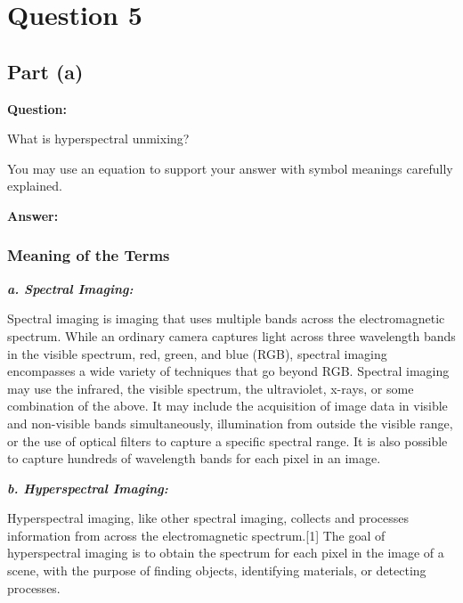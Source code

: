 \documentclass[fleqn, 11pt]{article}
\begin{document}
\newpage


\section*{Question 5}
\setcounter{equation}{0}


\subsection*{Part (a)}

\textbf{Question: }

\smallskip

What is hyperspectral unmixing? 

You may use an equation to support your answer with symbol
meanings carefully explained.

\hrulefill

\medskip

\textbf{Answer: }
\subsubsection*{Meaning of the Terms}

\textbf{\textit{a. Spectral Imaging: }}

\smallskip

Spectral imaging is imaging that uses multiple bands across the electromagnetic spectrum. While an ordinary camera captures light across three wavelength bands in the visible spectrum, red, green, and blue (RGB), spectral imaging encompasses a wide variety of techniques that go beyond RGB. Spectral imaging may use the infrared, the visible spectrum, the ultraviolet, x-rays, or some combination of the above. It may include the acquisition of image data in visible and non-visible bands simultaneously, illumination from outside the visible range, or the use of optical filters to capture a specific spectral range. It is also possible to capture hundreds of wavelength bands for each pixel in an image.

\medskip

\textbf{\textit{b. Hyperspectral Imaging:}}

\smallskip

Hyperspectral imaging, like other spectral imaging, collects and processes information from across the electromagnetic spectrum.[1] The goal of hyperspectral imaging is to obtain the spectrum for each pixel in the image of a scene, with the purpose of finding objects, identifying materials, or detecting processes.
\end{document}

